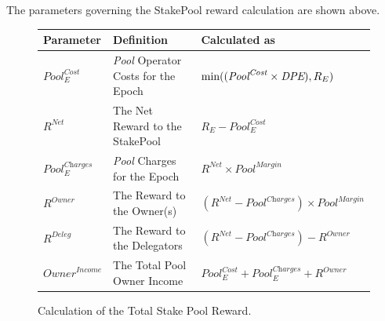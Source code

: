 \documentclass[11pt,a4paper,dvipsnames,twosided,final]{article}
\begin{document}
\noindent
The parameters governing the StakePool reward calculation are shown above.

\clearpage
\begin{figure}[h!]
\begin{center}
\begin{tabular}{||l|p{7.8cm}|l||}
  \hline \hline
\textbf{Parameter}  & \textbf{Definition} & \textbf{Calculated as} \\\hline
${\textit{Pool}}^{\textit{Cost}}_E$ & \textit{Pool} Operator Costs for the Epoch & $\textrm{min}((\textit{\textit{Pool}}^{\textit{Cost}} \times \textit{DPE}),R_E)$ \\\hline
$R^{\textit{Net}}$  & The Net Reward to the StakePool & $R_E - {\textit{Pool}}^{\textit{Cost}}_E$ \\\hline
${\textit{Pool}}^{\textit{Charges}}_E$ & \textit{Pool} Charges for the Epoch & $R^{\textit{Net}} \times \textit{Pool}^{\textit{Margin}}$ \\\hline
$R^{Owner}$ & The Reward to the Owner(s) & $(R^{\textit{Net}}-\textit{Pool}^{\textit{Charges}}) \times {\textit{Pool}}^{\textit{Margin}} $ \\\hline
$R^{Deleg}$ & The Reward to the Delegators & $(R^{\textit{Net}}-\textit{Pool}^{\textit{Charges}}) - R^{Owner}$ \\\hline
$\textit{Owner}^\textit{Income}$ & The Total Pool Owner Income &  ${\textit{Pool}}^{\textit{Cost}}_E + {\textit{Pool}}^{\textit{Charges}}_E + R^{Owner}$ \\\hline
\hline
\end{tabular}
\end{center}
\caption{Calculation of the Total Stake Pool Reward.}
\end{figure}
\end{document}
